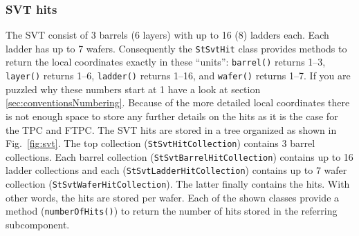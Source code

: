 \documentclass[twoside]{article}
\begin{document}
\subsubsection{SVT hits}
   
 

The SVT consist of 3 barrels (6 layers) with up to 16 (8) ladders
each. Each ladder has up to 7 wafers. Consequently the
\texttt{StSvtHit} class provides methods to return the local
coordinates exactly in these ``units'': \texttt{barrel()} returns
1--3, \texttt{layer()} returns 1--6, \texttt{ladder()} returns 1--16,
and \texttt{wafer()} returns 1--7. If you are puzzled why these
numbers start at 1 have a look at section
\ref{sec:conventionsNumbering}.  Because of the more detailed local
coordinates there is not enough space to store any further details on
the hits as it is the case for the TPC and FTPC.  The SVT hits are
stored in a tree organized as shown in Fig.~\ref{fig:svt}.  The top
collection (\texttt{StSvtHitCollection}) contains 3 barrel
collections.  Each barrel collection
(\texttt{StSvtBarrelHitCollection}) contains up to 16 ladder
collections and each (\texttt{StSvtLadderHitCollection}) contains up
to 7 wafer collection (\texttt{StSvtWaferHitCollection}). The latter
finally contains the hits.  With other words, the hits are stored per
wafer.  Each of the shown classes provide a method
(\texttt{numberOfHits()}) to return the number of hits stored in the
referring subcomponent. 
\end{document}
